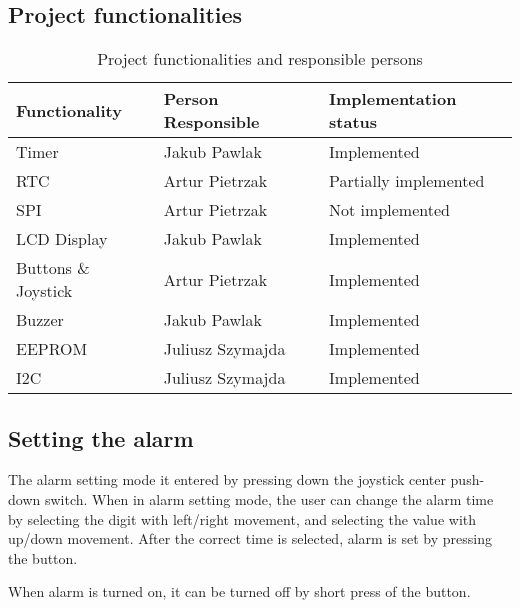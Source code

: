 \documentclass[10pt]{article}
\begin{document}
    \subsection{Project functionalities}
    \begin{table}[H]\centering
        \begin{tabular}{|l|l|l|}
            \hline
            \bf Functionality   & \bf Person Responsible    & \bf Implementation status                     \\ \hline
            Timer               & Jakub Pawlak              & Implemented                                   \\ \hline
            RTC                 & Artur Pietrzak            & \color{orange!80!red} Partially implemented   \\ \hline
            SPI                 & Artur Pietrzak            & \color{red} Not implemented                   \\ \hline
            LCD Display         & Jakub Pawlak              & Implemented                                   \\ \hline
            Buttons \& Joystick & Artur Pietrzak            & Implemented                                   \\ \hline
            Buzzer              & Jakub Pawlak              & Implemented                                   \\ \hline
            EEPROM              & Juliusz Szymajda          & Implemented                                   \\ \hline
            I2C                 & Juliusz Szymajda          & Implemented                                   \\ \hline
        \end{tabular}
        \caption{Project functionalities and responsible persons}
    \end{table}

    \subsection{Setting the alarm}
    The alarm setting mode it entered by pressing down the joystick center push-down switch.
    When in alarm setting mode, the user can change the alarm time by selecting the digit with left/right movement, and selecting the value with up/down movement.
    After the correct time is selected, alarm is set by pressing the button.

    When alarm is turned on, it can be turned off by short press of the button.
\end{document}
